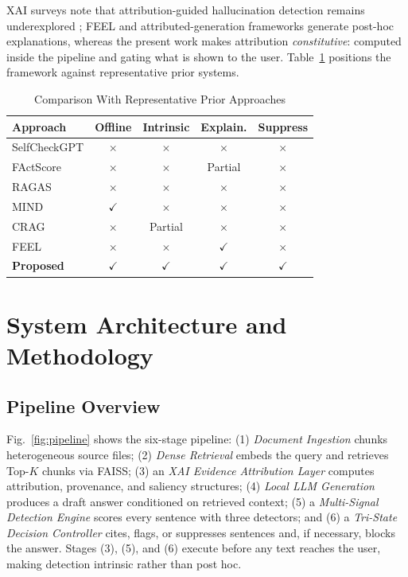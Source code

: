 \documentclass[conference]{IEEEtran}
\begin{document}
XAI surveys note that attribution-guided hallucination detection remains underexplored \cite{minaee2024xai}; FEEL \cite{zhang2024feel} and attributed-generation frameworks \cite{agrawal2024attributed} generate post-hoc explanations, whereas the present work makes attribution \emph{constitutive}: computed inside the pipeline and gating what is shown to the user. Table~\ref{tab:related} positions the framework against representative prior systems.

\begin{table}[!t]
\caption{Comparison With Representative Prior Approaches}
\label{tab:related}
\centering
\small
\begin{tabular}{@{}lcccc@{}}
\toprule
Approach & Offline & Intrinsic & Explain. & Suppress \\
\midrule
SelfCheckGPT \cite{manakul2023selfcheckgpt} & $\times$ & $\times$ & $\times$ & $\times$ \\
FActScore \cite{min2023factscore} & $\times$ & $\times$ & Partial & $\times$ \\
RAGAS \cite{es2024ragas} & $\times$ & $\times$ & $\times$ & $\times$ \\
MIND \cite{su2024mind} & $\checkmark$ & $\times$ & $\times$ & $\times$ \\
CRAG \cite{yan2024crag} & $\times$ & Partial & $\times$ & $\times$ \\
FEEL \cite{zhang2024feel} & $\times$ & $\times$ & $\checkmark$ & $\times$ \\
\textbf{Proposed} & $\checkmark$ & $\checkmark$ & $\checkmark$ & $\checkmark$ \\
\bottomrule
\end{tabular}
\end{table}

\section{System Architecture and Methodology}

\subsection{Pipeline Overview}
Fig.~\ref{fig:pipeline} shows the six-stage pipeline: (1) \emph{Document Ingestion} chunks heterogeneous source files; (2) \emph{Dense Retrieval} embeds the query and retrieves Top-$K$ chunks via FAISS; (3) an \emph{XAI Evidence Attribution Layer} computes attribution, provenance, and saliency structures; (4) \emph{Local LLM Generation} produces a draft answer conditioned on retrieved context; (5) a \emph{Multi-Signal Detection Engine} scores every sentence with three detectors; and (6) a \emph{Tri-State Decision Controller} cites, flags, or suppresses sentences and, if necessary, blocks the answer. Stages (3), (5), and (6) execute before any text reaches the user, making detection intrinsic rather than post hoc.
\end{document}
